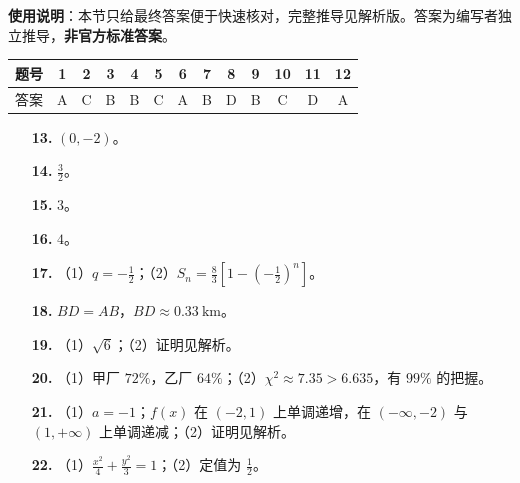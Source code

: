 
\begin{gknotice}
\textbf{使用说明}：本节只给最终答案便于快速核对，完整推导见解析版。答案为编写者独立推导，\textbf{非官方标准答案}。
\end{gknotice}

\begin{center}\begin{tabular}{ccccccccccccc}
\toprule
题号 & 1 & 2 & 3 & 4 & 5 & 6 & 7 & 8 & 9 & 10 & 11 & 12 \\
\midrule
答案 & A & C & B & B & C & A & B & D & B & C & D & A \\
\bottomrule
\end{tabular}\end{center}

\begin{itemize}[leftmargin=2.6em]
  \item[\textbf{13.}] $(0,-2)$。
  \item[\textbf{14.}] $\frac32$。
  \item[\textbf{15.}] $3$。
  \item[\textbf{16.}] $4$。
\end{itemize}

\begin{itemize}[leftmargin=2.6em]
  \item[\textbf{17.}] （1）$q=-\frac12$；（2）$S_n=\frac83\left[1-\left(-\frac12\right)^n\right]$。
  \item[\textbf{18.}] $BD=AB$，$BD\approx0.33\ \mathrm{km}$。
  \item[\textbf{19.}] （1）$\sqrt6$；（2）证明见解析。
  \item[\textbf{20.}] （1）甲厂 $72\%$，乙厂 $64\%$；（2）$\chi^2\approx7.35>6.635$，有 $99\%$ 的把握。
  \item[\textbf{21.}] （1）$a=-1$；$f(x)$ 在 $(-2,1)$ 上单调递增，在 $(-\infty,-2)$ 与 $(1,+\infty)$ 上单调递减；（2）证明见解析。
  \item[\textbf{22.}] （1）$\frac{x^2}{4}+\frac{y^2}{3}=1$；（2）定值为 $\frac12$。
\end{itemize}
